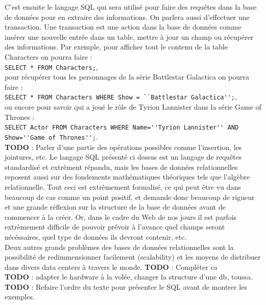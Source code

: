 \documentclass[11pt]{article}
\begin{document}
C'est ensuite le langage SQL qui sera utilisé pour faire des requêtes dans la base de données pour en extraire des informations. On parlera aussi d'effectuer une transaction. Une transaction est une action dans la base de données comme insérer une nouvelle entrée dans un table, mettre à jour un champ ou récupérer des informations. Par exemple, pour afficher tout le contenu de la table Characters on pourra faire : \\
\verb|SELECT * FROM Characters;|, \\
pour récupérer tous les personnages de la série Battlestar Galactica on pourra faire : \\
\verb|SELECT * FROM Characters WHERE Show = ``Battlestar Galactica'';|, \\
ou encore pour savoir qui a joué le rôle de Tyrion Lannister dans la série Game of Thrones : \\
\verb|SELECT Actor FROM Characters WHERE Name=''Tyrion Lannister'' AND Show=''Game of Thrones'';|. \\ 
\colorbox{BrickRed}{\textbf{TODO} : Parler d'une partie des opérations possibles comme l'insertion, les jointures, etc.}
Le langage SQL présenté ci dessus est un langage de requêtes standardisé et extrèment répandu, mais les bases de données relationnelles reposent aussi sur des fondements mathématiques théoriques tels que l'algèbre relationnelle. Tout ceci est extrèmement formalisé, ce qui peut être vu dans beaucoup de cas comme un point positif, et demande donc beaucoup de rigueur et une grande réflexion sur la structure de la base de données avant de commencer à la créer. Or, dans le cadre du Web de nos jours il est parfois extrèmement difficile de pouvoir prévoir à l'avance quel champs seront nécéssaires, quel type de données ils devront contenir, etc. \\
Deux autres grands problèmes des bases de données relationnelles sont la possibilité de redimmensionner facilement (scalability) et les moyens de distribuer dans divers data centers à travers le monde. \colorbox{BrickRed}{\textbf{TODO} : Compléter ca} \\
\colorbox{BrickRed}{\textbf{TODO} : adapter le hardware à la volée, changer la structure d'une db, toussa.} \\
\colorbox{BrickRed}{\textbf{TODO} : Refaire l'ordre du texte pour présenter le SQL avant de montrer les exemples.}
\end{document}
